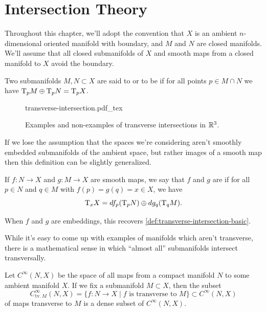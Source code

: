
\section{Intersection Theory}\label{sec:intersection-theory}

Throughout this chapter, we'll adopt the convention that $X$ is an ambient $n$-dimensional oriented manifold with boundary, and $M$ and $N$ are closed manifolds. We'll assume that all closed submanifolds of $X$ and smooth maps from a closed manifold to $X$ avoid the boundary.

\begin{definition}\label{def:transverse-intersection-basic}
	Two submanifolds $M,N\subset X$ are said to  or to be  if for all points $p\in M\cap N$ we have $\mathrm{T}_p M\oplus \mathrm{T}_p N = \mathrm{T}_p X$.
\end{definition}

\begin{figure}[ht]
	\centering
	{transverse-intersection.pdf_tex}
	\medskip
	\caption{Examples and non-examples of transverse intersections in $\mathbb{R}^3$.}\label{fig:transverse-intersection}
\end{figure}

If we lose the assumption that the spaces we're considering aren't smoothly embedded submanifolds of the ambient space, but rather images of a smooth map then this definition can be slightly generalized.

\begin{definition}\label{def:transverse-intersection}
	If $f : N \to X$ and $g : M \to X$ are smooth maps, we say that $f$ and $g$ are  if for all $p\in N$ and $q\in M$ with $f(p)=g(q)=x\in X$, we have
	\[
		\mathrm{T}_x X = df_p(\mathrm{T}_p N) \oplus dg_q(\mathrm{T}_q M).
	\]
\end{definition}

\begin{remark}
	When $f$ and $g$ are embeddings, this recovers \cref{def:transverse-intersection-basic}.
\end{remark}

While it's easy to come up with examples of manifolds which aren't transverse, there is a mathematical sense in which ``almost all'' submanifolds intersect transversally.

\begin{theorem}
	Let $C^\infty(N,X)$ be the space of all maps from a compact manifold $N$ to some ambient manifold $X$. If we fix a submanifold $M\subset X$, then the subset
	\[
		C^\infty_{\mathrm{tv.}\,M}(N,X)=\{ f : N \to X \mid f\textrm{ is transverse to } M\}\subset C^\infty(N,X)
	\]
	of maps transverse to $M$ is a dense subset of $C^\infty(N,X)$.
\end{theorem}

